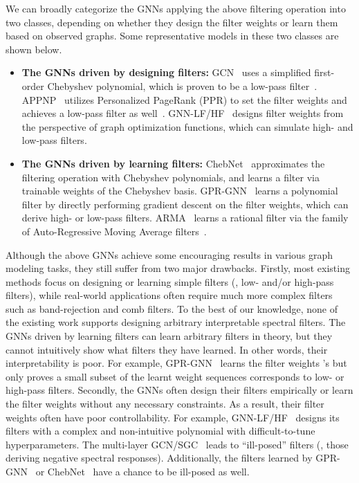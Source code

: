 \documentclass{article}
\begin{document}
We can broadly categorize the GNNs applying the above filtering operation into two classes, depending on whether they design the filter weights or learn them based on observed graphs. 
Some representative models in these two classes are shown below.

\begin{itemize}
    \item \textbf{The GNNs driven by designing filters:} GCN~\cite{kipf2016semi} uses a simplified first-order Chebyshev polynomial, which is proven to be a low-pass filter~\cite{balcilar2021analyzing,wu2019sgc,xu2020graphheat,zhu2021interpreting}. 
APPNP~\cite{appnp} utilizes Personalized PageRank (PPR) to set the filter weights and achieves a low-pass filter as well~\cite{klicpera2019diffusion,zhu2021interpreting}. 
    GNN-LF/HF~\cite{zhu2021interpreting} designs filter weights from the perspective of graph optimization functions, which can simulate high- and low-pass filters. 
\item \textbf{The GNNs driven by learning filters:}
    ChebNet~\cite{Chebnet} approximates the filtering operation with Chebyshev polynomials, and learns a filter via trainable weights of the Chebyshev basis.  
    GPR-GNN~\cite{chien2021GPR-GNN} learns a polynomial filter by directly performing gradient descent on the filter weights, which can derive high- or low-pass filters. ARMA~\cite{bianchi2021ARMA} learns a rational filter via the family of Auto-Regressive Moving Average filters~\cite{narang2013signal}. 
\end{itemize}




Although the above GNNs achieve some encouraging results in various graph modeling tasks, they still suffer from two major drawbacks. 
Firstly, most existing methods focus on designing or learning simple filters (, low- and/or high-pass filters), while real-world applications often require much more complex filters such as band-rejection and comb filters. 
To the best of our knowledge, none of the existing work supports designing arbitrary interpretable spectral filters. The GNNs driven by learning filters can learn arbitrary filters in theory, but they cannot intuitively show what filters they have learned. In other words, their interpretability is poor. For example, GPR-GNN~\cite{chien2021GPR-GNN} learns the filter weights 's but only proves a small subset of the learnt weight sequences corresponds to low- or high-pass filters.
Secondly, the GNNs often design their filters empirically or learn the filter weights without any necessary constraints. 
As a result, their filter weights often have poor  controllability. 
For example, GNN-LF/HF~\cite{zhu2021interpreting} designs its filters with a complex and non-intuitive polynomial with difficult-to-tune hyperparameters. The multi-layer GCN/SGC~\cite{kipf2016semi,wu2019sgc} leads to ``ill-posed'' filters (, those deriving negative spectral responses).
Additionally, the filters learned by GPR-GNN~\cite{chien2021GPR-GNN} or ChebNet~\cite{Chebnet}  have a chance to be ill-posed as well.
\end{document}
